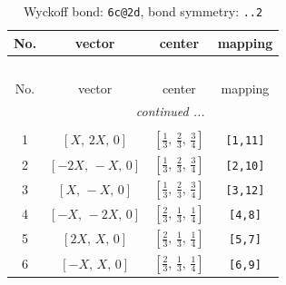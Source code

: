 \documentclass[fleqn,8pt]{jsarticle}
\begin{document}
\renewcommand{\arraystretch}{1.2}
\begin{longtable}{cccc}
\caption{Wyckoff bond: {\tt 6c@2d}, bond symmetry: {\tt ..2}}
 \\
 \hline \hline
No. & vector & center & mapping \\ \hline \endfirsthead

\multicolumn{3}{l}{\tablename\ \thetable{}} \\
 \hline \hline
No. & vector & center & mapping \\ \hline \endhead

 \hline \hline
\multicolumn{3}{r}{\footnotesize\it continued ...} \\ \endfoot

 \hline \hline
\multicolumn{3}{r}{} \\ \endlastfoot

1 & $\left[ X,\, 2 X,\, 0 \right]$ & $\left[ \frac{1}{3},\, \frac{2}{3},\, \frac{3}{4} \right]$ & {\tt [1,11]} \\ \hline
2 & $\left[ - 2 X,\, - X,\, 0 \right]$ & $\left[ \frac{1}{3},\, \frac{2}{3},\, \frac{3}{4} \right]$ & {\tt [2,10]} \\ \hline
3 & $\left[ X,\, - X,\, 0 \right]$ & $\left[ \frac{1}{3},\, \frac{2}{3},\, \frac{3}{4} \right]$ & {\tt [3,12]} \\ \hline
4 & $\left[ - X,\, - 2 X,\, 0 \right]$ & $\left[ \frac{2}{3},\, \frac{1}{3},\, \frac{1}{4} \right]$ & {\tt [4,8]} \\ \hline
5 & $\left[ 2 X,\, X,\, 0 \right]$ & $\left[ \frac{2}{3},\, \frac{1}{3},\, \frac{1}{4} \right]$ & {\tt [5,7]} \\ \hline
6 & $\left[ - X,\, X,\, 0 \right]$ & $\left[ \frac{2}{3},\, \frac{1}{3},\, \frac{1}{4} \right]$ & {\tt [6,9]} \\
\end{longtable}
\renewcommand{\arraystretch}{1.2}
\end{document}
